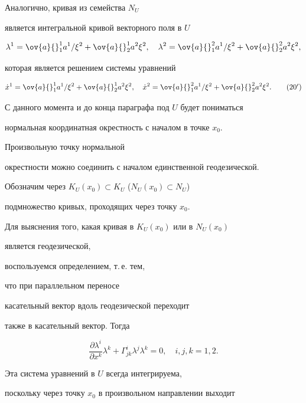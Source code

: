 Аналогично, кривая из семейства $N_U$


является интегральной кривой векторного поля в $U$


$$


\lambda^1=\ov{a}{}^1_1a^1/\xi^2+\ov{a}{}^1_2a^2\xi^2,\quad


\lambda^2=\ov{a}{}^2_1a^1/\xi^2+\ov{a}{}^2_2a^2\xi^2,


$$


которая является решением системы уравнений


\begin{equation}


\Dot{x}^1=\ov{a}{}^1_1a^1/\xi^2+\ov{a}{}^1_2a^2\xi^2,\quad


\Dot{x}^2=\ov{a}{}^2_1a^1/\xi^2+\ov{a}{}^2_2a^2\xi^2.\tag{$20'$}


\end{equation}





С данного момента и до конца параграфа под $U$ будет пониматься


нормальная координатная окрестность с началом в точке $x_0$.


Произвольную точку нормальной


окрестности можно соединить с началом единственной геодезической.


Обозначим через $K_U(x_0) \subset K_U$ ($N_U(x_0) \subset N_U$)


подмножество кривых, проходящих через точку $x_0$.


Для выяснения того, какая кривая в $K_U(x_0)$ или в $N_U(x_0)$


является геодезической,


воспользуемся определением, т.\,е. тем,


что при параллельном переносе


касательный вектор вдоль геодезической переходит


также в касательный вектор. Тогда


\begin{equation}


\frac{\partial \lambda^i}{\partial x^k}\lambda^k +


\Gamma^i_{jk}\lambda^j\lambda^k=0,\quad i,j,k=1,2.


\end{equation}


Эта система уравнений в $U$ всегда интегрируема,


поскольку через точку $x_0$ в произвольном направлении выходит


